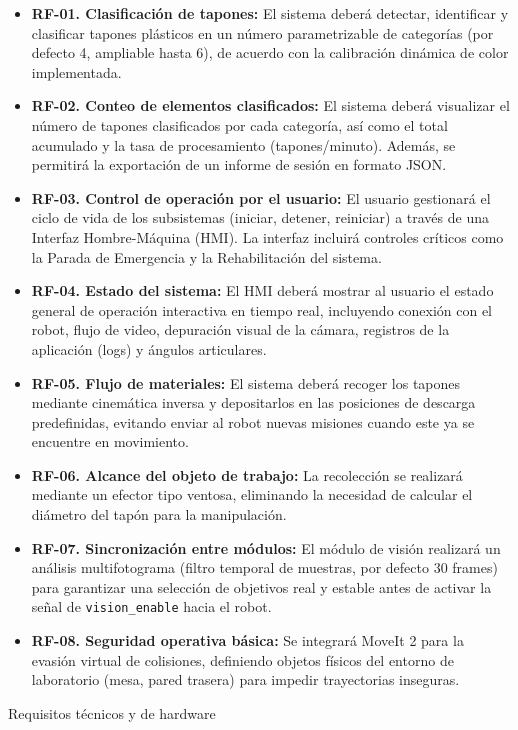 \documentclass[12pt,a4paper]{article}
\makeatletter
\newcommand{\subsecfmt}[1]{%
  {\large\bfseries\color{MediumBlue}#1}%
  \par\vspace{2pt}%
}
\renewcommand\subsection{%
  \@ifstar\subsection@star\subsection@nostar
}
\newcommand\subsection@nostar[1]{%
  \refstepcounter{subsection}%
  \addcontentsline{toc}{subsection}{\protect\numberline{\thesubsection}#1}%
  \vspace{10pt}%
  \subsecfmt{\thesubsection.\enspace #1}%
  \vspace{2pt}%
}
\newcommand\subsection@star[1]{%
  \vspace{10pt}\subsecfmt{#1}\vspace{2pt}%
}
\makeatother
\begin{document}
\begin{itemize}
    \item \textbf{RF-01. Clasificación de tapones:} El sistema deberá detectar, identificar y clasificar tapones plásticos en un número parametrizable de categorías (por defecto 4, ampliable hasta 6), de acuerdo con la calibración dinámica de color implementada.
    \item \textbf{RF-02. Conteo de elementos clasificados:} El sistema deberá visualizar el número de tapones clasificados por cada categoría, así como el total acumulado y la tasa de procesamiento (tapones/minuto). Además, se permitirá la exportación de un informe de sesión en formato JSON.
    \item \textbf{RF-03. Control de operación por el usuario:} El usuario gestionará el ciclo de vida de los subsistemas (iniciar, detener, reiniciar) a través de una Interfaz Hombre-Máquina (HMI). La interfaz incluirá controles críticos como la Parada de Emergencia y la Rehabilitación del sistema.
    \item \textbf{RF-04. Estado del sistema:} El HMI deberá mostrar al usuario el estado general de operación interactiva en tiempo real, incluyendo conexión con el robot, flujo de video, depuración visual de la cámara, registros de la aplicación (logs) y ángulos articulares.
    \item \textbf{RF-05. Flujo de materiales:} El sistema deberá recoger los tapones mediante cinemática inversa y depositarlos en las posiciones de descarga predefinidas, evitando enviar al robot nuevas misiones cuando este ya se encuentre en movimiento.
    \item \textbf{RF-06. Alcance del objeto de trabajo:} La recolección se realizará mediante un efector tipo ventosa, eliminando la necesidad de calcular el diámetro del tapón para la manipulación.
    \item \textbf{RF-07. Sincronización entre módulos:} El módulo de visión realizará un análisis multifotograma (filtro temporal de muestras, por defecto 30 frames) para garantizar una selección de objetivos real y estable antes de activar la señal de \texttt{vision\_enable} hacia el robot.
    \item \textbf{RF-08. Seguridad operativa básica:} Se integrará MoveIt 2 para la evasión virtual de colisiones, definiendo objetos físicos del entorno de laboratorio (mesa, pared trasera) para impedir trayectorias inseguras.
\end{itemize}

\subsection{Requisitos técnicos y de hardware}
\end{document}
